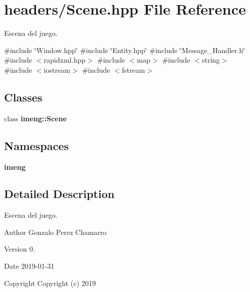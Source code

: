 \section{headers/\+Scene.hpp File Reference}
\label{_scene_8hpp}


Escena del juego.  


{\ttfamily \#include \char`\"{}Window.\+hpp\char`\"{}}\newline
{\ttfamily \#include \char`\"{}Entity.\+hpp\char`\"{}}\newline
{\ttfamily \#include \char`\"{}Message\+\_\+\+Handler.\+h\char`\"{}}\newline
{\ttfamily \#include $<$rapidxml.\+hpp$>$}\newline
{\ttfamily \#include $<$map$>$}\newline
{\ttfamily \#include $<$string$>$}\newline
{\ttfamily \#include $<$iostream$>$}\newline
{\ttfamily \#include $<$fstream$>$}\newline
\subsection*{Classes}
\begin{DoxyCompactItemize}
\item 
class \textbf{ imeng\+::\+Scene}
\end{DoxyCompactItemize}
\subsection*{Namespaces}
\begin{DoxyCompactItemize}
\item 
 \textbf{ imeng}
\end{DoxyCompactItemize}


\subsection{Detailed Description}
Escena del juego. 

\begin{DoxyAuthor}{Author}
Gonzalo Perez Chamarro 
\end{DoxyAuthor}
\begin{DoxyVersion}{Version}
0. 
\end{DoxyVersion}
\begin{DoxyDate}{Date}
2019-\/01-\/31
\end{DoxyDate}
\begin{DoxyCopyright}{Copyright}
Copyright (c) 2019 
\end{DoxyCopyright}
